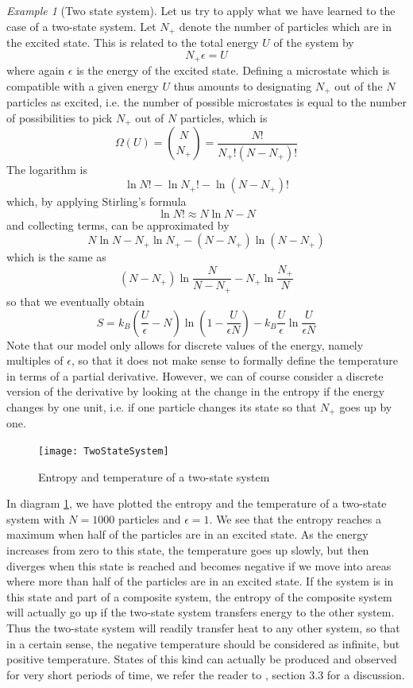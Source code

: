 \documentclass[a4paper, draft]{report}
\numberwithin{section}{chapter}
\numberwithin{equation}{chapter}
\theoremstyle{own}
\theoremstyle{remark}
\newtheorem{example}{Example}[section]
\begin{document}
\begin{example}[Two state system]
Let us try to apply what we have learned to the case of a two-state system. Let $N_+$ denote the number of particles which are in the excited state. This is related to the total energy $U$ of the system by
$$
N_+ \epsilon = U
$$
where again $\epsilon$ is the energy of the excited state. Defining a microstate which is compatible with a given energy $U$ thus amounts to designating $N_+$ out of the $N$ particles as excited, i.e. the number of possible microstates is equal to the number of possibilities to pick $N_+$ out of $N$ particles, which is
$$
\Omega(U) = \binom{N}{N_+} 
= \frac{N!}{N_+ ! (N-N_+)!}
$$
The logarithm is
$$
\ln N! - \ln N_+! - \ln (N-N_+)!
$$
which, by applying Stirling's formula 
$$
\ln N! \approx N \ln N - N
$$
and collecting terms, can be approximated by 
$$
N \ln N - N_+ \ln N_+ - (N - N_+) \ln (N - N_+) 
$$
which is the same as
$$
(N - N_+) \ln \frac{N}{N-N_+} - N_+ \ln \frac{N_+}{N}
$$
so that we eventually obtain
$$
S = k_B (\frac{U}{\epsilon} - N) \ln  (1 - \frac{U}{\epsilon N}) 
- k_B \frac{U}{\epsilon} \ln \frac{U}{\epsilon N}
$$
Note that our model only allows for discrete values of the energy, namely multiples of $\epsilon$, so that it does not make sense to formally define the temperature in terms of a partial derivative. However, we can of course consider a discrete version of the derivative by looking at the change in the entropy if the energy changes by one unit, i.e. if one particle changes its state so that $N_+$ goes up by one. 


\begin{figure}[ht]
\centering
\texttt{[image: TwoStateSystem]}
\caption{Entropy and temperature of a two-state system}
\label{fig:TwoStateSystem}
\end{figure}

In diagram 
\ref{fig:TwoStateSystem}, we have plotted the entropy and the temperature of a two-state system with $N=1000$ particles and $\epsilon = 1$. We see that the entropy reaches a maximum when half of the particles are in an excited state. As the energy increases from zero to this state, the temperature goes up slowly, but then diverges when this state is reached and becomes negative if we move into areas where more than half of the particles are in an excited state. If the system is in this state and part of a composite system, the entropy of the composite system will actually go up if the two-state system transfers energy to the other system. Thus the two-state system will readily transfer heat to any other system, so that in a certain sense, the negative temperature should be considered as infinite, but positive temperature. States of this kind can actually be produced and observed for very short periods of time, we refer the reader to \cite{Schroeder}, section 3.3 for a discussion.
\end{example}
\end{document}
